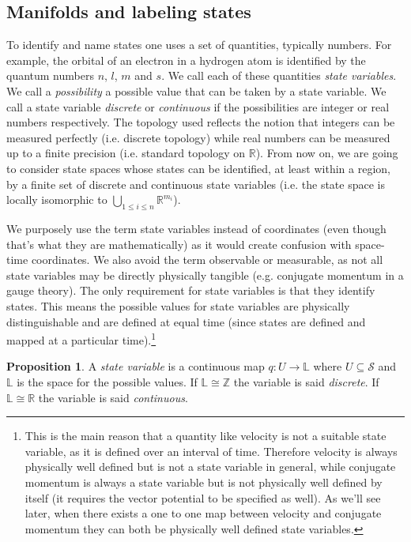 \documentclass[smallextended]{svjour3}
\numberwithin{equation}{section}
\theoremstyle{definition}
\newtheorem{prop}[equation]{Proposition}
\begin{document}
\subsection{Manifolds and labeling states}

To identify and name states one uses a set of quantities, typically numbers. For example, the orbital of an electron in a hydrogen atom is identified by the quantum numbers $n$, $l$, $m$ and $s$. We call each of these quantities \emph{state variables}. We call a \emph{possibility} a possible value that can be taken by a state variable. We call a state variable \emph{discrete} or \emph{continuous} if the possibilities are integer or real numbers respectively. The topology used reflects the notion that integers can be measured perfectly (i.e. discrete topology) while real numbers can be measured up to a finite precision (i.e. standard topology on $\mathbb{R}$). From now on, we are going to consider state spaces whose states can be identified, at least within a region, by a finite set of discrete and continuous state variables (i.e. the state space is locally isomorphic to $\bigcup\limits_{1 \leq i \leq n} \mathbb{R}^{m_i}$).

We purposely use the term state variables instead of coordinates (even though that's what they are mathematically) as it would create confusion with space-time coordinates. We also avoid the term observable or measurable, as not all state variables may be directly physically tangible (e.g. conjugate momentum in a gauge theory). The only requirement for state variables is that they identify states. This means the possible values for state variables are physically distinguishable and are defined at equal time (since states are defined and mapped at a particular time).\footnote{This is the main reason that a quantity like velocity is not a suitable state variable, as it is  defined over an interval of time. Therefore velocity is always physically well defined but is not a state variable in general, while conjugate momentum is always a state variable but is not physically well defined by itself (it requires the vector potential to be specified as well). As we'll see later, when there exists a one to one map between velocity and conjugate momentum they can both be physically well defined state variables.}

\begin{prop}\label{prop:state_variable}
	A \emph{state variable} is a continuous map $q : U \rightarrow \mathbb{L}$ where $U \subseteq \mathcal{S}$ and $\mathbb{L}$ is the space for the possible values. If $\mathbb{L}\cong \mathbb{Z}$ the variable is said \emph{discrete}. If $\mathbb{L}\cong \mathbb{R}$ the variable is said \emph{continuous}.
\end{prop}
\end{document}
